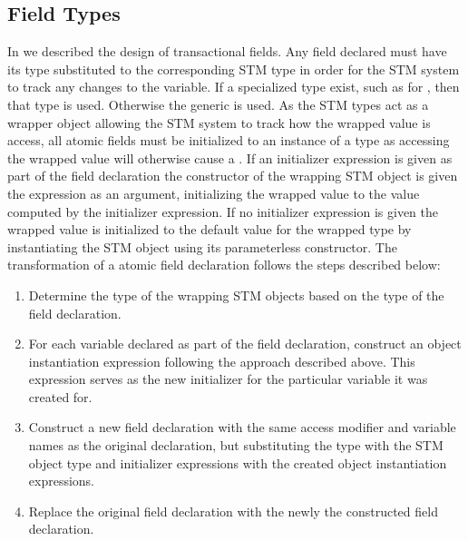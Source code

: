 \subsection{Field Types}\label{subsec:extension_field}
In  we described the design of transactional fields. Any field declared  must have its type substituted to the corresponding \ac{STM} type in order for the \ac{STM} system to track any changes to the variable. If a specialized type exist, such as  for , then that type is used. Otherwise the generic  is used.  As the \ac{STM} types act as a wrapper object allowing the \ac{STM} system to track how the wrapped value is access, all atomic fields must be initialized to an instance of a  type as accessing the wrapped value will otherwise cause a . If an initializer expression is given as part of the field declaration the constructor of the wrapping \ac{STM} object is given the expression as an argument, initializing the wrapped value to the value computed by the initializer expression. If no initializer expression is given the wrapped value is initialized to the default value for the wrapped type by instantiating the \ac{STM} object using its parameterless constructor. The transformation of a atomic field declaration follows the steps described below:

\begin{enumerate}
	\item Determine the type of the wrapping \ac{STM} objects based on the type of the field declaration.
	\item For each variable declared as part of the field declaration, construct an object instantiation expression following the approach described above. This expression serves as the new initializer for the particular variable it was created for.
	\item Construct a new field declaration with the same access modifier and variable names as the original declaration, but substituting the type with the \ac{STM} object type and initializer expressions with the created object instantiation expressions.
	\item Replace the original field declaration with the newly the constructed field declaration. 
\end{enumerate}

